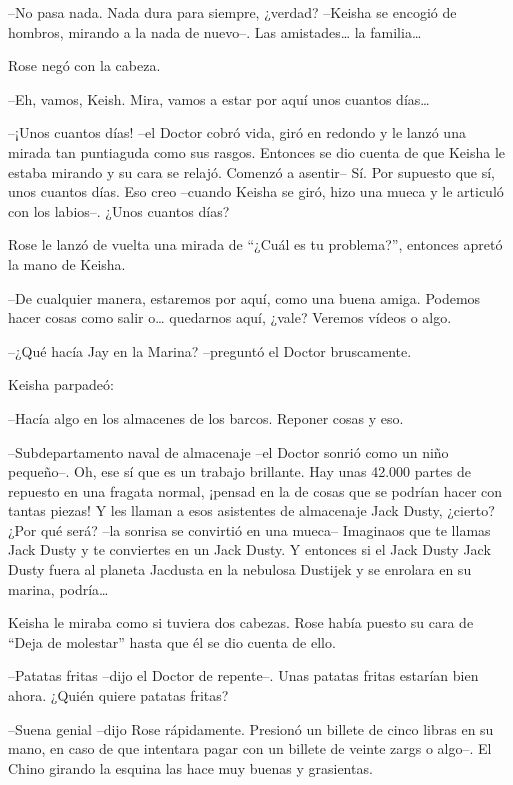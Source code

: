 {--No pasa nada. Nada dura para siempre, ¿verdad? --Keisha se encogió de
 hombros, mirando a la nada de nuevo--. Las amistades\ldots{} la
 familia\ldots{}}

{Rose negó con la cabeza.}

{--Eh, vamos, Keish. Mira, vamos a estar por aquí unos cuantos
 días\ldots{}}

{--¡Unos cuantos días! --el Doctor cobró vida, giró en redondo y le
 lanzó una mirada tan puntiaguda como sus rasgos. Entonces se dio cuenta
 de que Keisha le estaba mirando y su cara se relajó. Comenzó a asentir--
 Sí. Por supuesto que sí, unos cuantos días. Eso creo --cuando Keisha se
 giró, hizo una mueca y le articuló con los labios--. ¿Unos cuantos
días?}

{Rose le lanzó de vuelta una mirada de ``¿Cuál es tu problema?'',
entonces apretó la mano de Keisha.}

{--De cualquier manera, estaremos por aquí, como una buena amiga.
 Podemos hacer cosas como salir o\ldots{} quedarnos aquí, ¿vale? Veremos
vídeos o algo.}

{--¿Qué hacía Jay en la Marina? --preguntó el Doctor bruscamente.}

{Keisha parpadeó:}

{--Hacía algo en los almacenes de los barcos. Reponer cosas y eso.}

{--Subdepartamento naval de almacenaje --el Doctor sonrió como un niño
 pequeño--. Oh, ese sí que es un trabajo brillante. Hay unas 42.000
 partes de repuesto en una fragata normal, ¡pensad en la de cosas que se
 podrían hacer con tantas piezas! Y les llaman a esos asistentes de
 almacenaje Jack Dusty, ¿cierto? ¿Por qué será? --la sonrisa se convirtió
 en una mueca-- Imaginaos que te llamas Jack Dusty y te conviertes en un
 Jack Dusty. Y entonces si el Jack Dusty Jack Dusty fuera al planeta
 Jacdusta en la nebulosa Dustijek y se enrolara en su marina,
 podría\ldots{}}

{Keisha le miraba como si tuviera dos cabezas. Rose había puesto su cara
de ``Deja de molestar'' hasta que él se dio cuenta de ello.}

{--Patatas fritas --dijo el Doctor de repente--. Unas patatas fritas
estarían bien ahora. ¿Quién quiere patatas fritas?}

{--Suena genial --dijo Rose rápidamente. Presionó un billete de cinco
 libras en su mano, en caso de que intentara pagar con un billete de
 veinte zargs o algo--. El Chino girando la esquina las hace muy buenas y
grasientas.}

